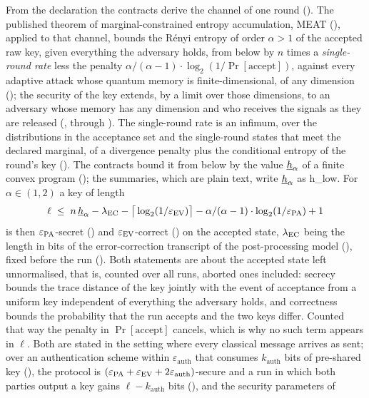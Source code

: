 From the declaration the contracts derive the channel of one round
(). The published theorem of
marginal-constrained entropy accumulation, MEAT
(), applied to that channel, bounds the R\'enyi
entropy of order $\alpha>1$ of the accepted raw key, given everything the
adversary holds, from below by $n$ times a \emph{single-round rate} less the
penalty $\alpha/(\alpha-1)\cdot\log_2(1/\Pr[\mathrm{accept}])$, against every
adaptive attack whose quantum memory is finite-dimensional, of any dimension
(); the security of the key extends,
by a limit over those dimensions, to an adversary whose memory has any
dimension and who receives the signals as they are released
(, through ).
The single-round rate is an infimum, over the distributions in the acceptance set and the single-round
states that meet the declared marginal, of a divergence penalty plus the
conditional entropy of the round's key (). The
contracts bound it from below by the value $\underline{h}_{\alpha}$ of a finite convex program
(); the summaries, which are plain text, write
$\underline{h}_{\alpha}$ as h\_low. For $\alpha\in(1,2)$ a key of length
\[
  \ell\;\le\;n\,\underline{h}_{\alpha}-\lambda_{\mathrm{EC}}-\big\lceil\log_2(1/\varepsilon_{\mathrm{EV}})\big\rceil
  -\alpha/(\alpha-1)\cdot\log_2(1/\varepsilon_{\mathrm{PA}})+1
\]
is then $\varepsilon_{\mathrm{PA}}$-secret () and $\varepsilon_{\mathrm{EV}}$-correct
() on the accepted state, $\lambda_{\mathrm{EC}}$ being the
length in bits of the error-correction transcript of the post-processing
model (), fixed before the run
(). Both statements are about the accepted state
left unnormalised, that is, counted over all runs, aborted ones included:
secrecy bounds the trace distance of the key jointly with the event of
acceptance from a uniform key independent of everything the adversary holds,
and correctness bounds the probability that the run accepts and the two keys
differ. Counted that way the penalty in $\Pr[\mathrm{accept}]$ cancels, which
is why no such term appears in $\ell$. Both are stated in the setting where
every classical message arrives as sent; over an authentication scheme within
$\varepsilon_{\mathrm{auth}}$ that consumes $k_{\mathrm{auth}}$ bits of
pre-shared key (), the protocol is
$(\varepsilon_{\mathrm{PA}}+\varepsilon_{\mathrm{EV}}+2\varepsilon_{\mathrm{auth}})$-secure and a run in which both
parties output a key gains $\ell-k_{\mathrm{auth}}$ bits
(), and the security parameters of
